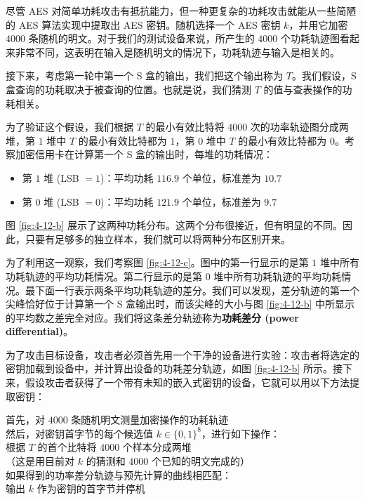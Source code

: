 \begin{snote}[差分功耗分析。]
尽管 AES 对简单功耗攻击有抵抗能力，但一种更复杂的功耗攻击就能从一些简陋的 AES 算法实现中提取出 AES 密钥。随机选择一个 AES 密钥 $k$，并用它加密 $4000$ 条随机的明文。对于我们的测试设备来说，所产生的 $4000$ 个功耗轨迹图看起来非常不同，这表明在输入是随机明文的情况下，功耗轨迹与输入是相关的。

接下来，考虑第一轮中第一个 S 盒的输出，我们把这个输出称为 $T$。我们假设，S 盒查询的功耗取决于被查询的位置。也就是说，我们猜测 $T$ 的值与查表操作的功耗相关。

为了验证这个假设，我们根据 $T$ 的最小有效比特将 $4000$ 次的功率轨迹图分成两堆，第 $1$ 堆中 $T$ 的最小有效比特都为 $1$，第 $0$ 堆中 $T$ 的最小有效比特都为 $0$。考察加密信用卡在计算第一个 S 盒的输出时，每堆的功耗情况：
\begin{itemize}
	\item 第 $1$ 堆 (LSB $=1$)：平均功耗 $116.9$ 个单位，标准差为 $10.7$
	\item 第 $0$ 堆 (LSB $=0$)：平均功耗 $121.9$ 个单位，标准差为 $9.7$
\end{itemize}
图 \ref{fig:4-12-b} 展示了这两种功耗分布。这两个分布很接近，但有明显的不同。因此，只要有足够多的独立样本，我们就可以将两种分布区别开来。

为了利用这一观察，我们考察图 \ref{fig:4-12-c}。图中的第一行显示的是第 $1$ 堆中所有功耗轨迹的平均功耗情况。第二行显示的是第 $0$ 堆中所有功耗轨迹的平均功耗情况。最下面一行表示两条平均功耗轨迹的差分。我们可以发现，差分轨迹的第一个尖峰恰好位于计算第一个 S 盒输出时，而该尖峰的大小与图 \ref{fig:4-12-b} 中所显示的平均数之差完全对应。我们将这条差分轨迹称为\textbf{功耗差分 (power differential)}。

为了攻击目标设备，攻击者必须首先用一个干净的设备进行实验：攻击者将选定的密钥加载到设备中，并计算出设备的功耗差分轨迹，如图 \ref{fig:4-12-b} 所示。接下来，假设攻击者获得了一个带有未知的嵌入式密钥的设备，它就可以用以下方法提取密钥：
 
\vspace*{10pt}

\hspace*{5pt} 首先，对 $4000$ 条随机明文测量加密操作的功耗轨迹\\
\hspace*{26pt} 然后，对密钥首字节的每个候选值 $k\in\{0,1\}^8$，进行如下操作：\\
\hspace*{50pt} 根据 $T$ 的首个比特将 $4000$ 个样本分成两堆\\
\hspace*{75pt} （这是用目前对 $k$ 的猜测和 $4000$ 个已知的明文完成的）\\
\hspace*{50pt} 如果得到的功率差分轨迹与预先计算的曲线相匹配：\\
\hspace*{75pt} 输出 $k$ 作为密钥的首字节并停机


\end{snote}
